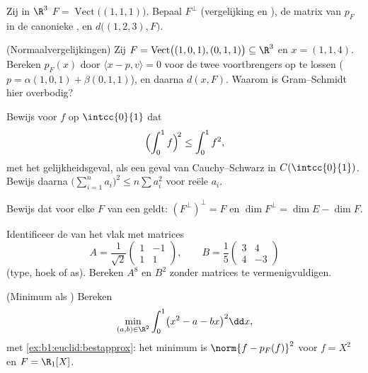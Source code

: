 \begin{exercise}[$\star$]\label{exo:b1:euclid:4}
Zij in $\R^3$ $F = \operatorname{Vect}\bigl((1,1,1)\bigr)$. Bepaal
$F^\perp$ (vergelijking en ), de matrix van $p_F$ in de
canonieke , en $d\bigl((1, 2, 3), F\bigr)$.
\end{exercise}

\begin{exercise}[$\star\star$]\label{exo:b1:euclid:5}
(Normaalvergelijkingen) Zij $F =
\operatorname{Vect}\bigl((1,0,1),(0,1,1)\bigr) \subseteq \R^3$ en
$x = (1, 1, 4)$. Bereken $p_F(x)$ door $\langle x - p, v \rangle =
0$ voor de twee voortbrengers op te lossen ($p = \alpha(1,0,1) +
\beta(0,1,1)$), en daarna $d(x, F)$. Waarom is Gram--Schmidt hier
overbodig?
\end{exercise}

\begin{exercise}[$\star\star$]\label{exo:b1:euclid:6}
Bewijs voor $f$  op $\intcc{0}{1}$ dat
\[
\Bigl(\int_0^1 f\Bigr)^{\!2} \leq \int_0^1 f^2 ,
\]
met het gelijkheidsgeval, als een geval van Cauchy--Schwarz in
$C(\intcc{0}{1})$. Bewijs daarna $\bigl(\sum_{i=1}^n a_i\bigr)^2
\leq n \sum a_i^2$ voor reële $a_i$.
\end{exercise}

\begin{exercise}[$\star\star$]\label{exo:b1:euclid:7}
Bewijs dat voor elke  $F$ van een 
geldt: $(F^{\perp})^{\perp} = F$ en $\dim F^{\perp} = \dim E - \dim
F$.
\end{exercise}

\begin{exercise}[$\star\star$]\label{exo:b1:euclid:8}
Identificeer de  van het vlak met matrices
\[
A = \frac{1}{\sqrt 2}\begin{pmatrix} 1 & -1\\ 1 & 1\end{pmatrix},
\qquad
B = \frac{1}{5}\begin{pmatrix} 3 & 4\\ 4 & -3\end{pmatrix}
\]
(type, hoek of as). Bereken $A^8$ en $B^2$ zonder matrices te
vermenigvuldigen.
\end{exercise}

\begin{exercise}[$\star\star\star$]\label{exo:b1:euclid:9}
(Minimum als ) Bereken
\[
\min_{(a, b) \in \R^2} \int_0^1 \bigl(x^2 - a - bx\bigr)^2 \dd x ,
\]
met \cref{ex:b1:euclid:bestapprox}: het minimum is $\norm{f -
p_F(f)}^2$ voor $f = X^2$ en $F = \R_1[X]$.
\end{exercise}

